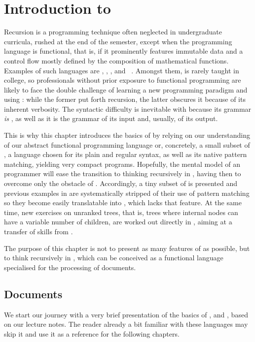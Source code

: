 \chapter{Introduction to \XSLT}

Recursion is a programming technique often neglected in undergraduate
curricula, rushed at the end of the semester, except when the
programming language is functional, that is, if it prominently
features immutable data and a control flow mostly defined by the
composition of mathematical functions. Examples of such languages are
\Scheme, \Haskell, \OCaml, \Erlang and \XSLT~\citep{Kay_2008}. Amongst
them, \XSLT is rarely taught in college, so professionals without
prior exposure to functional programming are likely to face the double
challenge of learning a new programming paradigm and using \XML: while
the former put forth recursion, the latter obscures it because of its
inherent verbosity. The syntactic difficulty is inevitable with \XSLT
because its grammar \emph{is} \XML, as well as it is the grammar of
its input and, usually, of its output.

This is why this chapter introduces the basics of \XSLT by relying on
our understanding of our abstract functional programming language or,
concretely, a small subset of \Erlang, a language chosen for its plain
and regular syntax, as well as its native pattern matching, yielding
very compact programs. Hopefully, the mental model of an \Erlang
programmer will ease the transition to thinking recursively in \XSLT,
having then to overcome only the obstacle of \XML. Accordingly, a tiny
subset of \XSLT is presented and previous examples in \Erlang are
systematically stripped of their use of pattern matching so they
become easily translatable into \XSLT, which lacks that feature. At
the same time, new exercises on unranked trees, that is, trees where
internal nodes can have a variable number of children, are worked out
directly in \XSLT, aiming at a transfer of skills from \Erlang. 

The purpose of this chapter is not to present as many features of
\XSLT as possible, but to think recursively in \XSLT, which can be
conceived as a functional language specialised for the processing of
\XML documents.

\section{Documents}

We start our journey with a very brief presentation of the basics of
\XML, \HTML and \DTD, based on our lecture notes. The reader already a
bit familiar with these languages may skip it and use it as a
reference for the following chapters.

